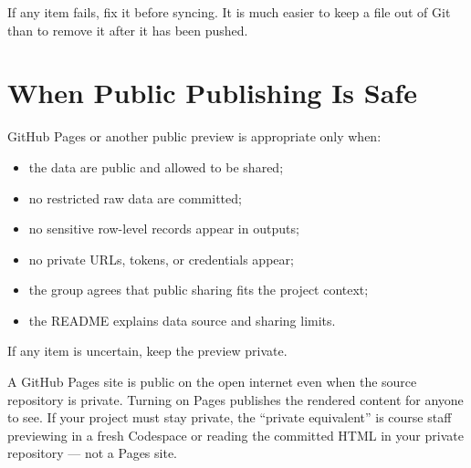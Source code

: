 \documentclass[
  letterpaper,
  DIV=11,
  numbers=noendperiod,
  oneside]{scrreprt}
\providecommand{\tightlist}{%
  \setlength{\itemsep}{0pt}\setlength{\parskip}{0pt}}
\begin{document}
If any item fails, fix it before syncing. It is much easier to keep a
file out of Git than to remove it after it has been pushed.

\section*{When Public Publishing Is
Safe}\label{when-public-publishing-is-safe}


GitHub Pages or another public preview is appropriate only when:

\begin{itemize}
\tightlist
\item
  the data are public and allowed to be shared;
\item
  no restricted raw data are committed;
\item
  no sensitive row-level records appear in outputs;
\item
  no private URLs, tokens, or credentials appear;
\item
  the group agrees that public sharing fits the project context;
\item
  the README explains data source and sharing limits.
\end{itemize}

If any item is uncertain, keep the preview private.

\begin{tcolorbox}[enhanced jigsaw, title=\textcolor{quarto-callout-warning-color}{\faExclamationTriangle}\hspace{0.5em}{GitHub Pages sites are always public}, arc=.35mm, toptitle=1mm, colframe=quarto-callout-warning-color-frame, toprule=.15mm, leftrule=.75mm, bottomtitle=1mm, opacityback=0, bottomrule=.15mm, coltitle=black, breakable, opacitybacktitle=0.6, titlerule=0mm, colback=white, left=2mm, colbacktitle=quarto-callout-warning-color!10!white, rightrule=.15mm]

A GitHub Pages site is public on the open internet even when the source
repository is private. Turning on Pages publishes the rendered content
for anyone to see. If your project must stay private, the ``private
equivalent'' is course staff previewing in a fresh Codespace or reading
the committed HTML in your private repository --- not a Pages site.

\end{tcolorbox}
\end{document}
